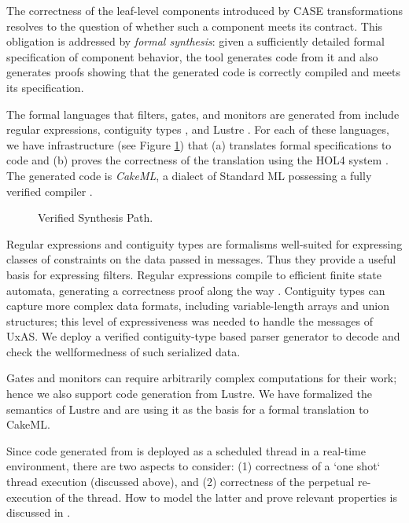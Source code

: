 The correctness of the leaf-level components introduced by CASE
transformations resolves to the question of whether such a component
meets its \agree{} contract. This obligation is addressed by
\emph{formal synthesis}: given a sufficiently detailed formal
specification of component behavior, the \splat{} tool generates code
from it and also generates proofs showing that the generated code is
correctly compiled and meets its specification.

The formal languages that filters, gates, and monitors are generated
from include regular expressions, contiguity types
\cite{contiguity-types}, and Lustre \cite{lustre}. For each of these
languages, we have infrastructure (see Figure \ref{fig:synthesis})
that (a) translates formal specifications to code and (b) proves the
correctness of the translation using the HOL4 system
\cite{hol4:overview}. The generated code is \emph{CakeML}, a dialect
of Standard ML \cite{SML97} possessing a fully verified compiler
\cite{cakeml}.

\begin{figure}[h]
\begin{center}
\end{center}
\caption{\splat{} Verified Synthesis Path.\label{fig:synthesis}}
\end{figure}

Regular expressions and contiguity types are formalisms well-suited
for expressing classes of constraints on the data passed in
messages. Thus they provide a useful basis for expressing
filters. Regular expressions compile to efficient finite state
automata, generating a correctness proof along the way
\cite{case-verified-filter}. Contiguity types can capture more complex
data formats, including variable-length arrays and union structures;
this level of expressiveness was needed to handle the messages of
UxAS. We deploy a verified contiguity-type based parser generator
\cite{contiguity-types} to decode and check the wellformedness of
such serialized data.

Gates and monitors can require arbitrarily complex computations for
their work; hence we also support code generation from Lustre. We have
formalized the semantics of Lustre and are using it as the basis for a
formal translation to CakeML.

Since code generated from \splat{} is deployed as a scheduled thread
in a real-time environment, there are two aspects to consider: (1)
correctness of a `one shot` thread execution (discussed above), and
(2) correctness of the perpetual re-execution of the thread. How to
model the latter and prove relevant properties is discussed in
\cite{johannes:repeat}.
